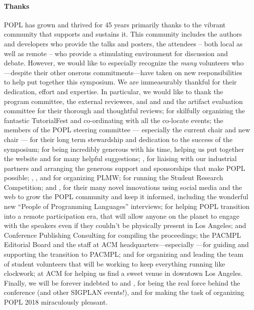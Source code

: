 \documentclass[11pt]{article}
\begin{document}
\paragraph{Thanks}
%
POPL has grown and thrived for 45 years primarily thanks to
the vibrant community that supports and sustains it.
%
This community includes the authors and developers who
provide the talks and posters, the attendees -- both local
as well as remote -- who provide a stimulating environment
for discussion and debate.
%
However, we would like to especially recognize the \emph{many}
volunteers who---despite their other onerous commitments---have
taken on new responsibilities to help put together this symposium.
%
We are immeasurably thankful for their dedication, effort and expertise.
%
In particular, we would like to thank
%
the program committee, the external reviewers,
and  and 
and the artifact evaluation committee for their
thorough and thoughtful reviews;
%
 for skilfully organizing
the fantastic TutorialFest and co-ordinating with
all the co-locate events;
%
the members of the POPL steering committee --- especially the current
chair  and new chair  ---
for their long term stewardship and dedication to the success
of the symposium;
%
 for being incredibly generous with his time,
helping us put together the website and for many helpful
suggestions;
%
, for liaising with our industrial
partners and arranging the generous support and
sponsorships that make POPL possible;
%
, ,
 and 
for organizing PLMW;
%
 for running the Student Research Competition;
%
 and , for their many novel innovations
using social media and the web to grow the POPL community and
keep it informed, including the wonderful new ``People of Programming Languages''
interviews;
%
 for helping POPL transition into a remote participation
era, that will allow anyone on the planet to engage with the speakers even
if they couldn't be physically present in Los Angeles;
%
%
 and Conference Publishing Consulting
for compiling the proceedings;
%
the PACMPL Editorial Board and the staff at ACM
headquarters---especially ---for guiding
and supporting the transition to PACMPL;
%
 and  for organizing
and leading the team of student volunteers that will be
working to keep everything running like clockwork;
%
 at ACM for helping us find a sweet
venue in downtown Los Angeles.
%
Finally, we will be forever indebted to
 and ,
for being the real force behind the conference
(and other SIGPLAN events!), and for making the
task of organizing POPL 2018 miraculously pleasant.
\end{document}
